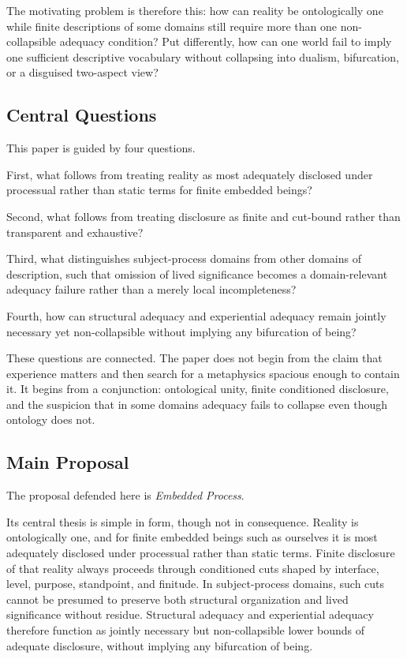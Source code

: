 \documentclass[11pt]{article}
\renewcommand{\emph}[1]{\textit{#1}}
\begin{document}
The motivating problem is therefore this: how can reality be ontologically one while finite descriptions of some domains still require more than one non-collapsible adequacy condition? Put differently, how can one world fail to imply one sufficient descriptive vocabulary without collapsing into dualism, bifurcation, or a disguised two-aspect view?

\subsection{Central Questions}

This paper is guided by four questions.

First, what follows from treating reality as most adequately disclosed under processual rather than static terms for finite embedded beings?

Second, what follows from treating disclosure as finite and cut-bound rather than transparent and exhaustive?

Third, what distinguishes subject-process domains from other domains of description, such that omission of lived significance becomes a domain-relevant adequacy failure rather than a merely local incompleteness?

Fourth, how can structural adequacy and experiential adequacy remain jointly necessary yet non-collapsible without implying any bifurcation of being?

These questions are connected. The paper does not begin from the claim that experience matters and then search for a metaphysics spacious enough to contain it. It begins from a conjunction: ontological unity, finite conditioned disclosure, and the suspicion that in some domains adequacy fails to collapse even though ontology does not.

\subsection{Main Proposal}

The proposal defended here is \emph{Embedded Process}.

Its central thesis is simple in form, though not in consequence. Reality is ontologically one, and for finite embedded beings such as ourselves it is most adequately disclosed under processual rather than static terms. Finite disclosure of that reality always proceeds through conditioned cuts shaped by interface, level, purpose, standpoint, and finitude. In subject-process domains, such cuts cannot be presumed to preserve both structural organization and lived significance without residue. Structural adequacy and experiential adequacy therefore function as jointly necessary but non-collapsible lower bounds of adequate disclosure, without implying any bifurcation of being.
\end{document}
